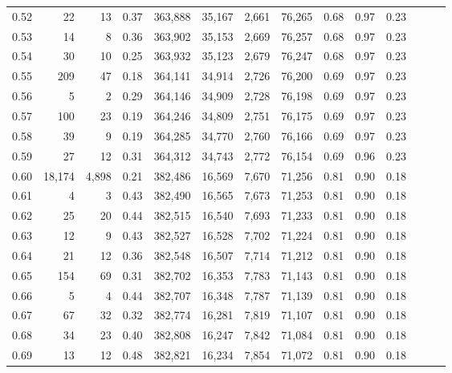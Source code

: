 \begin{tabular}{rrrrrrrrrrrrrr}
0.52 &      22 &      13 &  0.37 &  363,888 &   35,167 &   2,661 &  76,265 &  0.68 &  0.97 &      0.23 \\
0.53 &      14 &       8 &  0.36 &  363,902 &   35,153 &   2,669 &  76,257 &  0.68 &  0.97 &      0.23 \\
0.54 &      30 &      10 &  0.25 &  363,932 &   35,123 &   2,679 &  76,247 &  0.68 &  0.97 &      0.23 \\
0.55 &     209 &      47 &  0.18 &  364,141 &   34,914 &   2,726 &  76,200 &  0.69 &  0.97 &      0.23 \\
0.56 &       5 &       2 &  0.29 &  364,146 &   34,909 &   2,728 &  76,198 &  0.69 &  0.97 &      0.23 \\
0.57 &     100 &      23 &  0.19 &  364,246 &   34,809 &   2,751 &  76,175 &  0.69 &  0.97 &      0.23 \\
0.58 &      39 &       9 &  0.19 &  364,285 &   34,770 &   2,760 &  76,166 &  0.69 &  0.97 &      0.23 \\
0.59 &      27 &      12 &  0.31 &  364,312 &   34,743 &   2,772 &  76,154 &  0.69 &  0.96 &      0.23 \\
0.60 &  18,174 &   4,898 &  0.21 &  382,486 &   16,569 &   7,670 &  71,256 &  0.81 &  0.90 &      0.18 \\
0.61 &       4 &       3 &  0.43 &  382,490 &   16,565 &   7,673 &  71,253 &  0.81 &  0.90 &      0.18 \\
0.62 &      25 &      20 &  0.44 &  382,515 &   16,540 &   7,693 &  71,233 &  0.81 &  0.90 &      0.18 \\
0.63 &      12 &       9 &  0.43 &  382,527 &   16,528 &   7,702 &  71,224 &  0.81 &  0.90 &      0.18 \\
0.64 &      21 &      12 &  0.36 &  382,548 &   16,507 &   7,714 &  71,212 &  0.81 &  0.90 &      0.18 \\
0.65 &     154 &      69 &  0.31 &  382,702 &   16,353 &   7,783 &  71,143 &  0.81 &  0.90 &      0.18 \\
0.66 &       5 &       4 &  0.44 &  382,707 &   16,348 &   7,787 &  71,139 &  0.81 &  0.90 &      0.18 \\
0.67 &      67 &      32 &  0.32 &  382,774 &   16,281 &   7,819 &  71,107 &  0.81 &  0.90 &      0.18 \\
0.68 &      34 &      23 &  0.40 &  382,808 &   16,247 &   7,842 &  71,084 &  0.81 &  0.90 &      0.18 \\
0.69 &      13 &      12 &  0.48 &  382,821 &   16,234 &   7,854 &  71,072 &  0.81 &  0.90 &      0.18 \\

\end{tabular}
